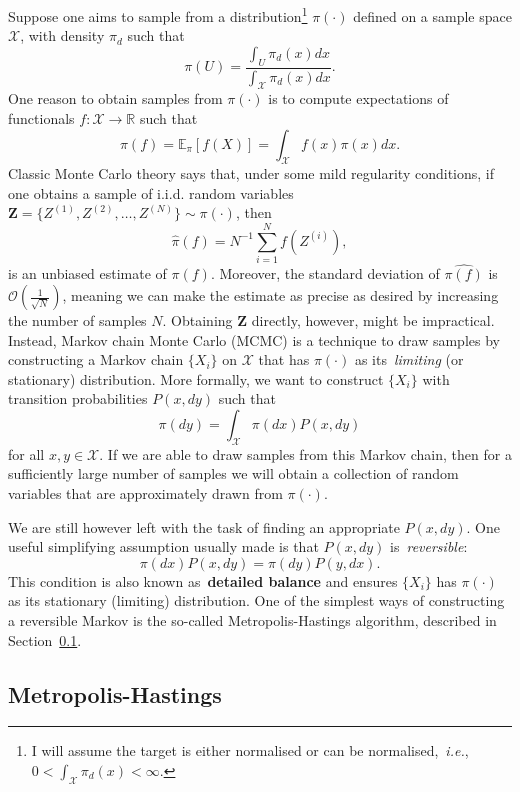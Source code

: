 Suppose one aims to sample from a distribution\footnote{I will assume the target is either normalised or can be normalised,~\textit{i.e.}, $ 0 < \int_{\mathcal{X}} \pi_d(x) <\infty$. } $\pi(\cdot)$ defined on a sample space $\mathcal{X}$, with density $\pi_d$ such that 
\[ \pi(U) = \frac{\int_{U} \pi_d(x)dx }{\int_{\mathcal{X}} \pi_d(x)dx}. \]
One reason to obtain samples from $\pi(\cdot)$ is to compute expectations of functionals $f :\mathcal{X} \to \mathbb{R}$ such that
\[ \pi(f) = \mathbb{E}_{\pi} [f(X)] = \int_{\mathcal{X}} f(x) \pi(x) dx. \] 
Classic Monte Carlo theory says that, under some mild regularity conditions, if one obtains a sample of i.i.d. random variables $\boldsymbol Z = \{ Z^{(1)}, Z^{(2)}, \ldots, Z^{(N)} \} \sim \pi(\cdot)$, then
\[ \hat{\pi}(f) = N^{-1}\sum_{i=1}^N f(Z^{(i)}), \]
is an unbiased estimate of $\pi(f)$.
Moreover, the standard deviation of $\hat{\pi(f)}$ is $\mathcal{O}(\frac{1}{\sqrt{N}})$, meaning we can make the estimate as precise as desired by increasing the number of samples $N$.
Obtaining $\boldsymbol Z$ directly, however, might be impractical.
Instead, Markov chain Monte Carlo (MCMC) is a technique to draw samples by constructing a Markov chain $\{X_i\}$ on $\mathcal{X}$ that has $\pi(\cdot)$ as its~\textit{limiting} (or stationary) distribution. 
More formally, we want to construct $\{X_i\}$ with transition probabilities $P(x, dy)$ such that
\[ \pi(dy) = \int_{\mathcal{X}} \pi(dx) P(x, dy)  \]
for all $x,y \in \mathcal{X}$.
If we are able to draw samples from this Markov chain, then for a sufficiently large number of samples we will obtain a collection of random variables that are approximately drawn from $\pi(\cdot)$.

We are still however left with the task of finding an appropriate $P(x, dy)$.
One useful simplifying assumption usually made is that $P(x, dy)$ is~\textit{reversible}:
\[ \pi(dx) P(x, dy) = \pi(dy) P(y, dx) .\]
This condition is also known as~\textbf{detailed balance} and ensures $\{X_i\}$ has $\pi(\cdot)$ as its stationary (limiting) distribution.
One of the simplest ways of constructing a reversible Markov is the so-called Metropolis-Hastings algorithm, described in Section~\ref{sec:MH}. %

\subsection{Metropolis-Hastings}
\label{sec:MH}


